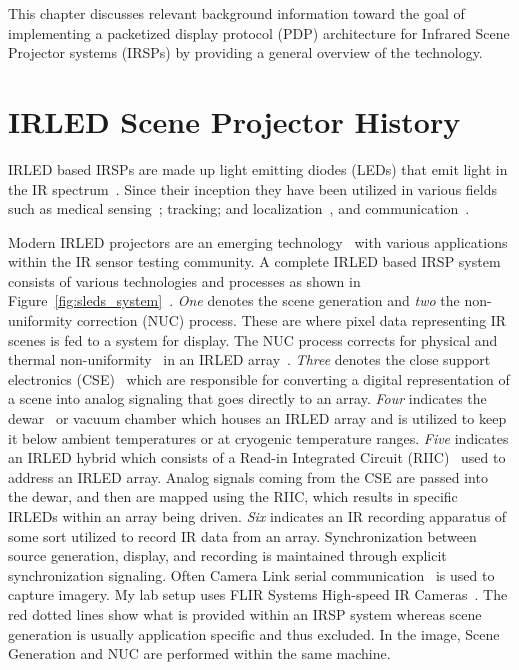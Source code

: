 \label{chap:background}

This chapter discusses relevant background information toward the goal of implementing a packetized display protocol (PDP) architecture for Infrared Scene Projector systems (IRSPs) by providing a general overview of the technology.

\section{IRLED Scene Projector History}

    IRLED based IRSPs are made up light emitting diodes (LEDs) that emit light in the IR spectrum~\cite{BiardGary1966}. Since their inception they have been utilized in various fields such as medical sensing~\cite{YamanishiHamaguri1995,MeeksEtAl1998,Sadick2009,MonteiroEtAl2011,TakhtfooladiEtAl2015}; tracking; and localization~\cite{Kimon2001,ZeylikovichEtAl2003,PlotogVladescu2015,ScholzEtAl2015,WalshDaemsSteckel2015}, and communication~\cite{GeorgopoulosKormakopoulos1986,EscobosaEtAl2004,SohnEtAl2007,JangEtAl2012,CossuEtAl2014}.

    Modern IRLED projectors are an emerging technology~\cite{AhmedEtAl2018, NabhaEtAl2018, HernandezEtAl2018, HernandezEtAl2019_2, DeputyEtAl2019} with various applications within the IR sensor testing community. A complete IRLED based IRSP system consists of various technologies and processes as shown in Figure~\ref{fig:sleds_system}~\cite{HouserEtAl2018_2}. \emph{One} denotes the scene generation and \emph{two} the non-uniformity correction (NUC) process. These are where pixel data representing IR scenes is fed to a system for display. The NUC process corrects for physical and thermal non-uniformity~\cite{BarakhshanEtAl2017} in an IRLED array~\cite{BarakhshanEtAl2018}. \emph{Three} denotes the close support electronics (CSE)~\cite{EjzakEtAl2015} which are responsible for converting a digital representation of a scene into analog signaling that goes directly to an array. \emph{Four} indicates the dewar~\cite{LangeEtAl2011, MarksEtAl2017} or vacuum chamber which houses an IRLED array and is utilized to keep it below ambient temperatures or at cryogenic temperature ranges. \emph{Five} indicates an IRLED hybrid which consists of a Read-in Integrated Circuit (RIIC)~\cite{HernandezEtAl2017} used to address an IRLED array. Analog signals coming from the CSE are passed into the dewar, and then are mapped using the RIIC, which results in specific IRLEDs within an array being driven. \emph{Six} indicates an IR recording apparatus of some sort utilized to record IR data from an array. Synchronization between source generation, display, and recording is maintained through explicit synchronization signaling. Often Camera Link serial communication~\cite{BaslerEtAl2000, ZhuEtAl2008} is used to capture imagery. My lab setup uses FLIR Systems High-speed IR Cameras~\cite{FLIR2014_1, FLIR2014_2, FLIR2016}. The red dotted lines show what is provided within an IRSP system whereas scene generation is usually application specific and thus excluded. In the image, Scene Generation and NUC are performed within the same machine.

